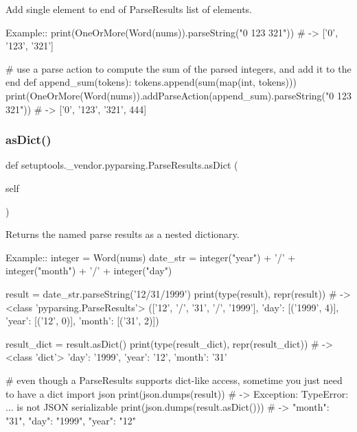 \begin{DoxyVerb}Add single element to end of ParseResults list of elements.

Example::
    print(OneOrMore(Word(nums)).parseString("0 123 321")) # -> ['0', '123', '321']
    
    # use a parse action to compute the sum of the parsed integers, and add it to the end
    def append_sum(tokens):
tokens.append(sum(map(int, tokens)))
    print(OneOrMore(Word(nums)).addParseAction(append_sum).parseString("0 123 321")) # -> ['0', '123', '321', 444]
\end{DoxyVerb}
 \mbox{\label{classsetuptools_1_1__vendor_1_1pyparsing_1_1_parse_results_aa94e10c70716802a5bd2d265bbaa2f65}} 
\subsubsection{\texorpdfstring{as\+Dict()}{asDict()}}
{\footnotesize\ttfamily def setuptools.\+\_\+vendor.\+pyparsing.\+Parse\+Results.\+as\+Dict (\begin{DoxyParamCaption}\item[{}]{self }\end{DoxyParamCaption})}

\begin{DoxyVerb}Returns the named parse results as a nested dictionary.

Example::
    integer = Word(nums)
    date_str = integer("year") + '/' + integer("month") + '/' + integer("day")
    
    result = date_str.parseString('12/31/1999')
    print(type(result), repr(result)) # -> <class 'pyparsing.ParseResults'> (['12', '/', '31', '/', '1999'], {'day': [('1999', 4)], 'year': [('12', 0)], 'month': [('31', 2)]})
    
    result_dict = result.asDict()
    print(type(result_dict), repr(result_dict)) # -> <class 'dict'> {'day': '1999', 'year': '12', 'month': '31'}

    # even though a ParseResults supports dict-like access, sometime you just need to have a dict
    import json
    print(json.dumps(result)) # -> Exception: TypeError: ... is not JSON serializable
    print(json.dumps(result.asDict())) # -> {"month": "31", "day": "1999", "year": "12"}
\end{DoxyVerb}
 \mbox{\label{classsetuptools_1_1__vendor_1_1pyparsing_1_1_parse_results_a8d1cc9ef72b2fcf972c240eae0e59e87}} 

